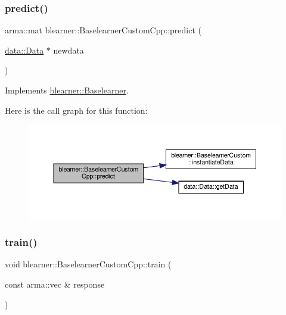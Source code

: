 \subsubsection{\texorpdfstring{predict()}{predict()}\hspace{0.1cm}{\footnotesize\ttfamily [2/2]}}
{\footnotesize\ttfamily arma\+::mat blearner\+::\+Baselearner\+Custom\+Cpp\+::predict (\begin{DoxyParamCaption}\item[{\hyperlink{classdata_1_1_data}{data\+::\+Data} $\ast$}]{newdata }\end{DoxyParamCaption})\hspace{0.3cm}{\ttfamily [virtual]}}



Implements \hyperlink{classblearner_1_1_baselearner_ae2ef5e018783578e02b3b5a33fa94eae}{blearner\+::\+Baselearner}.

Here is the call graph for this function\+:
\nopagebreak
\begin{figure}[H]
\begin{center}
\leavevmode
\includegraphics[width=350pt]{classblearner_1_1_baselearner_custom_cpp_a55fb45a929fea01f79fa3dcad7698174_cgraph}
\end{center}
\end{figure}
\mbox{\label{classblearner_1_1_baselearner_custom_cpp_a7437b1175498b928d3202b586527d2c4}} 
\subsubsection{\texorpdfstring{train()}{train()}}
{\footnotesize\ttfamily void blearner\+::\+Baselearner\+Custom\+Cpp\+::train (\begin{DoxyParamCaption}\item[{const arma\+::vec \&}]{response }\end{DoxyParamCaption})\hspace{0.3cm}{\ttfamily [virtual]}}



